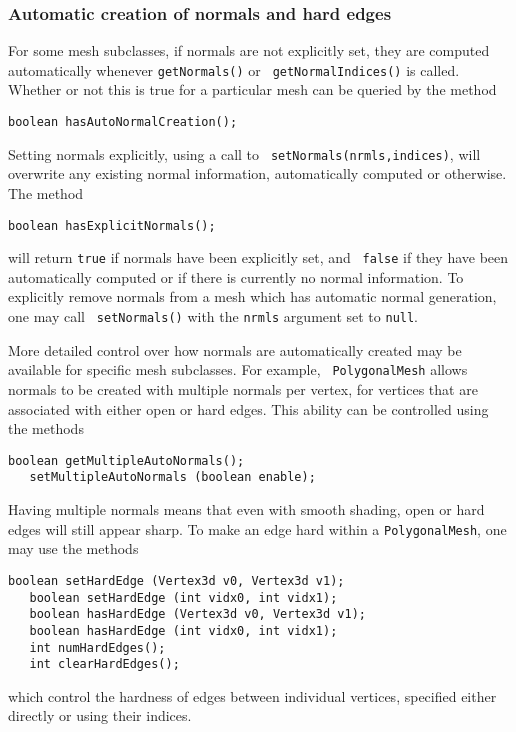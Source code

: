\subsubsection{Automatic creation of normals and hard edges}
\label{AutoNormalCreation:sec}

For some mesh subclasses, if normals are not explicitly set, they are
computed automatically whenever {\tt getNormals()} or {\tt
getNormalIndices()} is called. Whether or not this is true
for a particular mesh can be queried by the method
%
\begin{lstlisting}[]
   boolean hasAutoNormalCreation();
\end{lstlisting}
%
Setting normals explicitly, using a call to {\tt
setNormals(nrmls,indices)}, will overwrite any existing normal information,
automatically computed or otherwise. The method
%
\begin{lstlisting}[]
   boolean hasExplicitNormals();
\end{lstlisting}
%
will return {\tt true} if normals have been explicitly set, and {\tt
false} if they have been automatically computed or if there is
currently no normal information. To explicitly remove normals from a
mesh which has automatic normal generation, one may call {\tt
setNormals()} with the {\tt nrmls} argument set to {\tt null}.

More detailed control over how normals are automatically created may
be available for specific mesh subclasses. For example, {\tt
PolygonalMesh} allows normals to be created with multiple normals per
vertex, for vertices that are associated with either open or hard
edges. This ability can be controlled using the methods
%
\begin{lstlisting}[]
   boolean getMultipleAutoNormals();
   setMultipleAutoNormals (boolean enable);
\end{lstlisting}
%
Having multiple normals means that even with smooth shading, open or
hard edges will still appear sharp. To make an edge hard within
a {\tt PolygonalMesh}, one may use the methods
%
\begin{lstlisting}[]
   boolean setHardEdge (Vertex3d v0, Vertex3d v1);
   boolean setHardEdge (int vidx0, int vidx1);
   boolean hasHardEdge (Vertex3d v0, Vertex3d v1);
   boolean hasHardEdge (int vidx0, int vidx1);
   int numHardEdges();
   int clearHardEdges();
\end{lstlisting}
%
which control the hardness of edges between individual vertices,
specified either directly or using their indices.

